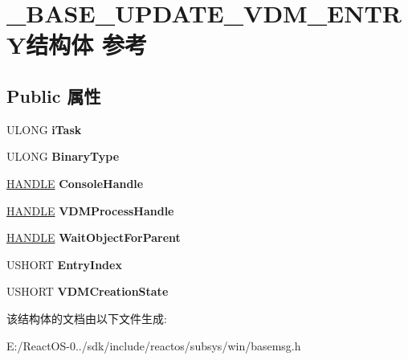 \hypertarget{struct___b_a_s_e___u_p_d_a_t_e___v_d_m___e_n_t_r_y}{}\section{\+\_\+\+B\+A\+S\+E\+\_\+\+U\+P\+D\+A\+T\+E\+\_\+\+V\+D\+M\+\_\+\+E\+N\+T\+R\+Y结构体 参考}
\label{struct___b_a_s_e___u_p_d_a_t_e___v_d_m___e_n_t_r_y}
\subsection*{Public 属性}
\begin{DoxyCompactItemize}
\item 
\mbox{\label{struct___b_a_s_e___u_p_d_a_t_e___v_d_m___e_n_t_r_y_ac0e7d50c977ee0dc8c1cec202fffbecf}} 
U\+L\+O\+NG {\bfseries i\+Task}
\item 
\mbox{\label{struct___b_a_s_e___u_p_d_a_t_e___v_d_m___e_n_t_r_y_a0d7e89887dbcf0f0bece30b6038378f6}} 
U\+L\+O\+NG {\bfseries Binary\+Type}
\item 
\mbox{\label{struct___b_a_s_e___u_p_d_a_t_e___v_d_m___e_n_t_r_y_ada766959ee67e8532651c0d669d56ac6}} 
\hyperlink{interfacevoid}{H\+A\+N\+D\+LE} {\bfseries Console\+Handle}
\item 
\mbox{\label{struct___b_a_s_e___u_p_d_a_t_e___v_d_m___e_n_t_r_y_a4934496994947e186ab580f842e17666}} 
\hyperlink{interfacevoid}{H\+A\+N\+D\+LE} {\bfseries V\+D\+M\+Process\+Handle}
\item 
\mbox{\label{struct___b_a_s_e___u_p_d_a_t_e___v_d_m___e_n_t_r_y_a31780c0112c2a9e3b48af8631c7510ac}} 
\hyperlink{interfacevoid}{H\+A\+N\+D\+LE} {\bfseries Wait\+Object\+For\+Parent}
\item 
\mbox{\label{struct___b_a_s_e___u_p_d_a_t_e___v_d_m___e_n_t_r_y_ab47161db55460bcfc930658883a8e517}} 
U\+S\+H\+O\+RT {\bfseries Entry\+Index}
\item 
\mbox{\label{struct___b_a_s_e___u_p_d_a_t_e___v_d_m___e_n_t_r_y_aad878c64cb9328c9d6b067600386df5e}} 
U\+S\+H\+O\+RT {\bfseries V\+D\+M\+Creation\+State}
\end{DoxyCompactItemize}


该结构体的文档由以下文件生成\+:\begin{DoxyCompactItemize}
\item 
E\+:/\+React\+O\+S-\/0../sdk/include/reactos/subsys/win/basemsg.\+h\end{DoxyCompactItemize}
